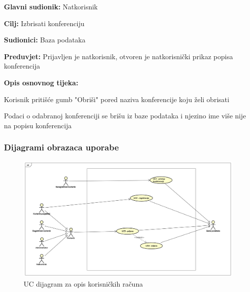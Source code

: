 					\noindent {}
					\begin{packed_item}
						
						\item \textbf{Glavni sudionik: } Natkorisnik
						\item  \textbf{Cilj:} Izbrisati konferenciju
						\item  \textbf{Sudionici:} Baza podataka
						\item  \textbf{Preduvjet:} Prijavljen je natkorisnik, otvoren je natkorisnički prikaz popisa konferencija
						\item  \textbf{Opis osnovnog tijeka:}
						
						\item[] \begin{packed_enum}
							
							\item Korisnik pritišće gumb "Obriši" pored naziva konferencije koju želi obrisati
							\item Podaci o odabranoj konferenciji se brišu iz baze podataka i njezino ime više nije na popisu konferencija
							
						\end{packed_enum}
					\end{packed_item}
				
				\clearpage
				\subsubsection{Dijagrami obrazaca uporabe}
					
					\begin{figure} [hbt!]
						\includegraphics[width=\linewidth]{Slike/UCDiagramUserProfilesRevised.png}
						\caption{UC dijagram za opis korisničkih računa}
					\end{figure}
					
